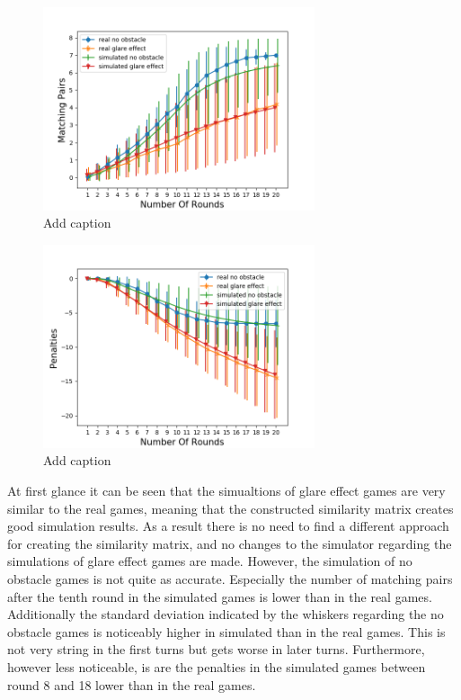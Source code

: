 \begin{minipage}{0.5\textwidth}
	\begin{figure}[H]
		\centering
		\includegraphics[width=8cm]{images/simulationInitial1.png}
		\caption[Bild kurz]{Add caption}
		\label{fig:simIn1}
	\end{figure}
\end{minipage}
\begin{minipage}{0.5\textwidth}
	\begin{figure}[H]
		\centering
		\includegraphics[width=8cm]{images/simulationInitial2.png}
		\caption[Bild kurz]{Add caption}
		\label{fig:simIn2}
	\end{figure}
\end{minipage}

At first glance it can be seen that the simualtions of glare effect games are very similar to the real games, meaning that the constructed similarity matrix creates good simulation results. As a result there is no need to find a different approach for creating the similarity matrix, and no changes to the simulator regarding the simulations of glare effect games are made. However, the simulation of no obstacle games is not quite as accurate. Especially the number of matching pairs after the tenth round in the simulated games is lower than in the real games. Additionally the standard deviation indicated by the whiskers regarding the no obstacle games is noticeably higher in simulated than in the real games. This is not very string in the first turns but gets worse in later turns. Furthermore, however less noticeable, is are the penalties in the simulated games between round 8 and 18 lower than in the real games.


